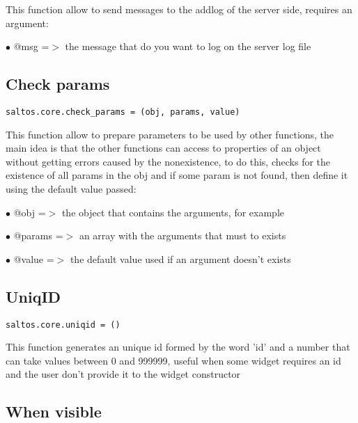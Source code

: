 \documentclass[a4paper]{book}
\begin{document}
This function allow to send messages to the addlog of the server side, requires an argument:

\begin{compactitem}
\item[\color{myblue}$\bullet$] @msg =$>$ the message that do you want to log on the server log file
\end{compactitem}

\hypertarget{toc512}{}
\subsection{Check params}

\begin{lstlisting}
saltos.core.check_params = (obj, params, value)
\end{lstlisting}

This function allow to prepare parameters to be used by other functions, the main idea
is that the other functions can access to properties of an object without getting errors
caused by the nonexistence, to do this, checks for the existence of all params in the obj
and if some param is not found, then define it using the default value passed:

\begin{compactitem}
\item[\color{myblue}$\bullet$] @obj    =$>$ the object that contains the arguments, for example
\item[\color{myblue}$\bullet$] @params =$>$ an array with the arguments that must to exists
\item[\color{myblue}$\bullet$] @value  =$>$ the default value used if an argument doesn't exists
\end{compactitem}

\hypertarget{toc513}{}
\subsection{UniqID}

\begin{lstlisting}
saltos.core.uniqid = ()
\end{lstlisting}

This function generates an unique id formed by the word 'id' and a number that can take
values between 0 and 999999, useful when some widget requires an id and the user don't
provide it to the widget constructor

\hypertarget{toc514}{}
\subsection{When visible}
\end{document}
